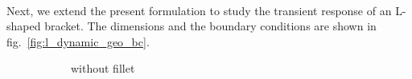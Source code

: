 \paragraph{}
Next, we extend the present formulation to study the transient response of an L-shaped bracket.
The dimensions and the boundary conditions are shown in fig.~\ref{fig:l_dynamic_geo_bc}.
    \begin{figure}
        \begin{subfigure}[b]{1\linewidth}
            \centering
            \caption{without fillet}
        \end{subfigure}
        \begin{subfigure}[b]{1\linewidth}
            \centering
\end{subfigure}
\end{figure}
